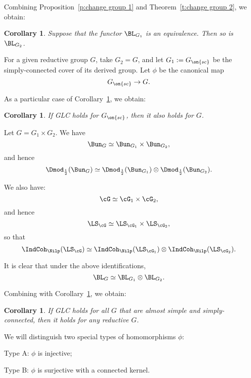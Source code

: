 \documentclass[9pt]{amsart}
\newtheorem{cor}[subsubsection]{Corollary}
\theoremstyle{remark}
\theoremstyle{definition}
\theoremstyle{remark}
\newcommand{\thmref}[1]{Theorem~\ref{#1}}
\newcommand{\propref}[1]{Proposition~\ref{#1}}
\newcommand{\corref}[1]{Corollary~\ref{#1}}
\numberwithin{equation}{section}
\begin{document}
\sssec{}

Combining \propref{p:change group 1} and \thmref{t:change group 2}, we obtain:

\begin{cor} \label{c:change group}
Suppose that the functor $\BL_{G_1}$ is an equivalence. Then so is $\BL_{G_2}$. 
\end{cor}

\sssec{}

For a given reductive group $G$, take $G_2=G$, and let $G_1:=G_{\on{sc}}$ be the simply-connected cover of its derived group.
Let $\phi$ be the canonical map 
$$G_{\on{sc}}\to G.$$

As a particular case of \corref{c:change group}, we obtain:

\begin{cor} \label{c:prel sc}
If GLC holds for $G_{\on{sc}}$, then it also holds for $G$.
\end{cor} 

\sssec{}

Let $G=G_1\times G_2$. We have
$$\Bun_G\simeq \Bun_{G_1}\times \Bun_{G_2},$$
and hence
$$\Dmod_{\frac{1}{2}}(\Bun_G) \simeq \Dmod_{\frac{1}{2}}(\Bun_{G_1}) \otimes \Dmod_{\frac{1}{2}}(\Bun_{G_2}).$$

We also have:
$$\cG\simeq \cG_1\times \cG_2,$$
and hence
$$\LS_\cG\simeq \LS_{\cG_1}\times \LS_{\cG_2},$$
so that
$$\IndCoh_\Nilp(\LS_\cG)\simeq \IndCoh_\Nilp(\LS_{\cG_1})\otimes \IndCoh_\Nilp(\LS_{\cG_2}).$$

It is clear that under the above identifications,
$$\BL_G\simeq \BL_{G_1}\otimes \BL_{G_2}.$$

Combining with \corref{c:prel sc}, we obtain:

\begin{cor} \label{c:sc}
If GLC holds for all $G$ that are almost simple and simply-connected, then it holds for any
reductive $G$.
\end{cor} 

\ssec{Proof of \thmref{t:change group 2}} \label{ss:change group 2}

\sssec{}

We will distinguish two special types of homomorphisms $\phi$:

\medskip

\noindent Type A: $\phi$ is injective;

\smallskip

\noindent Type B: $\phi$ is surjective with a connected kernel.

\medskip
\end{document}
